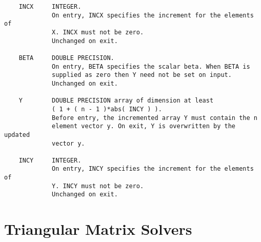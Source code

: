\documentclass[10pt]{book}
\begin{document}
\begin{verbatim}
    INCX     INTEGER.
             On entry, INCX specifies the increment for the elements of
             X. INCX must not be zero.
             Unchanged on exit.

    BETA     DOUBLE PRECISION.
             On entry, BETA specifies the scalar beta. When BETA is
             supplied as zero then Y need not be set on input.
             Unchanged on exit.

    Y        DOUBLE PRECISION array of dimension at least
             ( 1 + ( n - 1 )*abs( INCY ) ).
             Before entry, the incremented array Y must contain the n
             element vector y. On exit, Y is overwritten by the updated
             vector y.

    INCY     INTEGER.
             On entry, INCY specifies the increment for the elements of
             Y. INCY must not be zero.
             Unchanged on exit.
\end{verbatim}

\newpage
\section{Triangular Matrix Solvers}

\vspace{0.2in}
\end{document}
